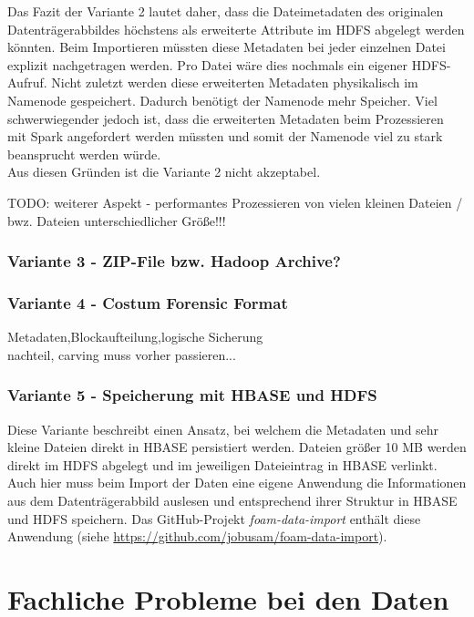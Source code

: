 \noindent
Das Fazit der Variante 2 lautet daher, dass die Dateimetadaten des originalen Datenträgerabbildes höchstens als erweiterte Attribute im HDFS abgelegt werden könnten. Beim Importieren müssten diese Metadaten bei jeder einzelnen Datei explizit nachgetragen werden. Pro Datei wäre dies nochmals ein eigener HDFS-Aufruf. Nicht zuletzt werden diese erweiterten Metadaten physikalisch im Namenode gespeichert. Dadurch benötigt der Namenode mehr Speicher. Viel schwerwiegender jedoch ist, dass die erweiterten Metadaten beim Prozessieren mit Spark angefordert werden müssten und somit der Namenode viel zu stark beansprucht werden würde.\\
Aus diesen Gründen ist die Variante 2 nicht akzeptabel. 

\noindent
TODO: weiterer Aspekt - performantes Prozessieren von vielen kleinen Dateien / bwz. Dateien unterschiedlicher Größe!!!\\

\subsubsection{Variante 3 - ZIP-File bzw. Hadoop Archive?}


\subsubsection{Variante 4 - Costum Forensic Format}
Metadaten,Blockaufteilung,logische Sicherung\\
nachteil, carving muss vorher passieren...

\subsubsection{Variante 5 - Speicherung mit HBASE und HDFS}
Diese Variante beschreibt einen Ansatz, bei welchem die Metadaten und sehr kleine Dateien direkt in HBASE persistiert werden. Dateien größer 10 MB werden direkt im HDFS abgelegt und im jeweiligen Dateieintrag in HBASE verlinkt. Auch hier muss beim Import der Daten eine eigene Anwendung die Informationen aus dem Datenträgerabbild auslesen und entsprechend ihrer Struktur in HBASE und HDFS speichern. Das GitHub-Projekt \textit{foam-data-import} enthält diese Anwendung (siehe \url{https://github.com/jobusam/foam-data-import}).\\


\section{Fachliche Probleme bei den Daten}

